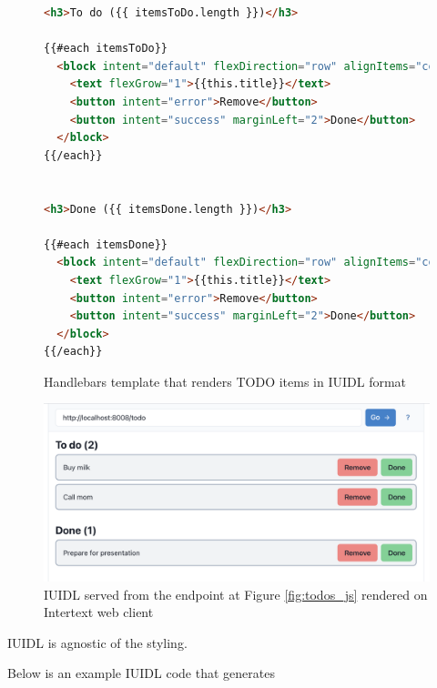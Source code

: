 \begin{figure}[H]
\begin{minipage}{\linewidth}
\begin{lstlisting}[language=html]
<h3>To do ({{ itemsToDo.length }})</h3>

{{#each itemsToDo}}
  <block intent="default" flexDirection="row" alignItems="center" paddingLeft="4">
    <text flexGrow="1">{{this.title}}</text>
    <button intent="error">Remove</button>
    <button intent="success" marginLeft="2">Done</button>
  </block>
{{/each}}


<h3>Done ({{ itemsDone.length }})</h3>

{{#each itemsDone}}
  <block intent="default" flexDirection="row" alignItems="center" paddingLeft="4">
    <text flexGrow="1">{{this.title}}</text>
    <button intent="error">Remove</button>
    <button intent="success" marginLeft="2">Done</button>
  </block>
{{/each}}
\end{lstlisting}
\end{minipage}
\caption{Handlebars template that renders TODO items in IUIDL format}%
\label{fig:todos_template}%
\end{figure}


\begin{figure}[H]
  \centering
  \includegraphics[width=13cm]{thesis/paper/images/todos.png}
  \caption{IUIDL served from the endpoint at Figure \ref{fig:todos_js} rendered on Intertext web client}%
  \label{fig:todos_output}%
\end{figure}



IUIDL is agnostic of the styling. 



Below is an example IUIDL code that generates 



 